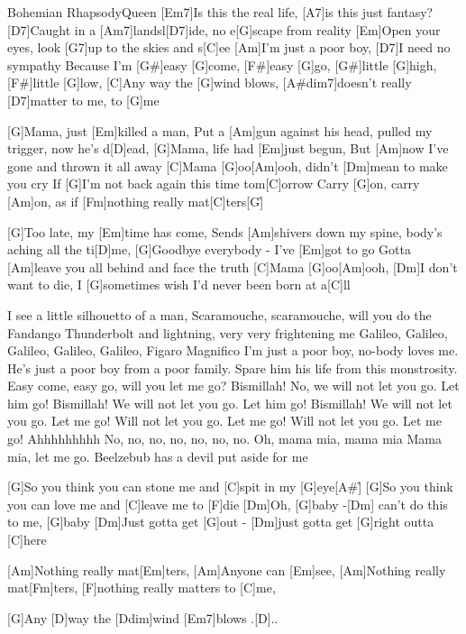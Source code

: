 \documentclass[../main.tex]{subfiles}
\begin{document}
\begin{song}[3]{Bohemian Rhapsody}{Queen}{}
[Em7]Is this the real life, [A7]is this just fantasy?
[D7]Caught in a [Am7]landsl[D7]ide, no e[G]scape from reality
[Em]Open your eyes, look [G7]up to the skies and s[C]ee
[Am]I'm just a poor boy, [D7]I need no sympathy
Because I'm [G#]easy [G]come, [F#]easy [G]go, [G#]little [G]high, [F#]little [G]low,
[C]Any way the [G]wind blows, [A#dim7]doesn't really [D7]matter to me, to [G]me

[G]Mama, just [Em]killed a man,
Put a [Am]gun against his head, pulled my trigger, now he's d[D]ead,
[G]Mama, life had [Em]just begun,
But [Am]now I've gone and thrown it all away
[C]Mama [G]oo[Am]ooh, didn't [Dm]mean to make you cry
If [G]I'm not back again this time tom[C]orrow
Carry [G]on, carry [Am]on, as if [Fm]nothing really mat[C]ters[G]{\h}

[G]Too late, my [Em]time has come,
Sends [Am]shivers down my spine, body's aching all the ti[D]me,
[G]Goodbye everybody - I've [Em]got to go
Gotta [Am]leave you all behind and face the truth
[C]Mama [G]oo[Am]ooh, [Dm]I don't want to die,
I [G]sometimes wish I'd never been born at a[C]ll


I see a little silhouetto of a man,
Scaramouche, scaramouche, will you do the Fandango
Thunderbolt and lightning, very very frightening me
Galileo, Galileo, Galileo, Galileo, Galileo, Figaro Magnifico
I'm just a poor boy, no-body loves me.
He's just a poor boy from a poor family.
Spare him his life from this monstrosity.
Easy come, easy go, will you let me go?  Bismillah!
No, we will not let you go. Let him go! Bismillah!
We will not let you go. Let him go! Bismillah!  We will not let you go. Let me go!
Will not let you go. Let me go! Will not let you go. Let me go! Ahhhhhhhhh
No, no, no, no, no, no, no.  Oh, mama mia, mama mia
Mama mia, let me go. Beelzebub has a devil put aside for me

[G]So you think you can stone me and [C]spit in my [G]eye[A#]{\h}
[G]So you think you can love me and [C]leave me to [F]die
[Dm]Oh, [G]baby -[Dm] can't do this to me, [G]baby
[Dm]Just gotta get [G]out - [Dm]just gotta get [G]right outta [C]here

[Am]Nothing really mat[Em]ters,
[Am]Anyone can [Em]see,
[Am]Nothing really mat[Fm]ters, [F]nothing really matters to [C]me,

[G]Any [D]way the [Ddim]wind [Em7]blows .[D]..
\end{song}
\end{document}
